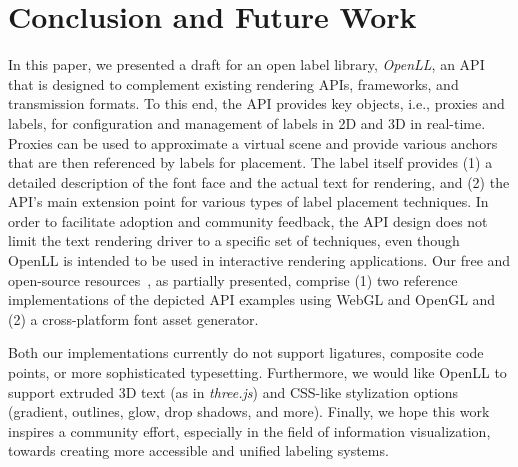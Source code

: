 \section{Conclusion and Future Work}
\label{sec:conclusion}
\noindent
In this paper, we presented a draft for an open label library, \emph{OpenLL}, an API that is designed to complement existing rendering APIs, frameworks, and transmission formats.
To this end, the API provides key objects, i.e., proxies and labels, for configuration and management of labels in 2D and 3D in real-time.
Proxies can be used to approximate a virtual scene and provide various anchors that are then referenced by labels for placement.
The label itself provides (1) a detailed description of the font face and the actual text for rendering, and (2) the API's main extension point for various types of label placement techniques.
In order to facilitate adoption and community feedback, the API design does not limit the text rendering driver to a specific set of techniques, even though OpenLL is intended to be used in interactive rendering applications.
Our free and open-source resources~\cite{openll2018}, as partially presented, comprise (1) two reference implementations of the depicted API examples using WebGL and OpenGL and (2) a cross-platform font asset generator.

Both our implementations currently do not support ligatures, composite code points, or more sophisticated typesetting. 
Furthermore, we would like OpenLL to support extruded 3D text (as in \emph{three.js}) and CSS-like stylization options (gradient, outlines, glow, drop shadows, and more).
Finally, we hope this work inspires a community effort, especially in the field of information visualization, towards creating more accessible and unified labeling systems.
